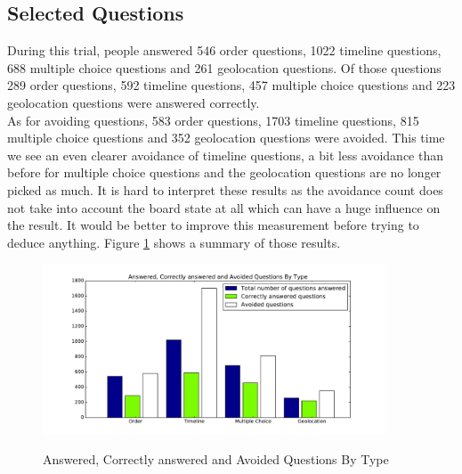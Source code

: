 \subsection{Selected Questions}
During this trial, people answered 546 order questions, 1022 timeline questions, 688 multiple choice questions and 261 geolocation questions. Of those questions 289 order questions, 592 timeline questions, 457 multiple choice questions and 223 geolocation questions were answered correctly.\\
As for avoiding questions, 583 order questions, 1703 timeline questions, 815 multiple choice questions and 352 geolocation questions were avoided. This time we see an even clearer avoidance of timeline questions, a bit less avoidance than before for multiple choice questions and the geolocation questions are no longer picked as much. It is hard to interpret these results as the avoidance count does not take into account the board state at all which can have a huge influence on the result. It would be better to improve this measurement before trying to deduce anything. Figure \ref{fig:p2TotCorrectAvoid} shows a summary of those results.
\begin{figure}
\centering
{\includegraphics[width=4in]{images/pilot_2_selected_questions.pdf}}
\caption{Answered, Correctly answered and Avoided Questions By Type}
\label{fig:p2TotCorrectAvoid}
\end{figure}
